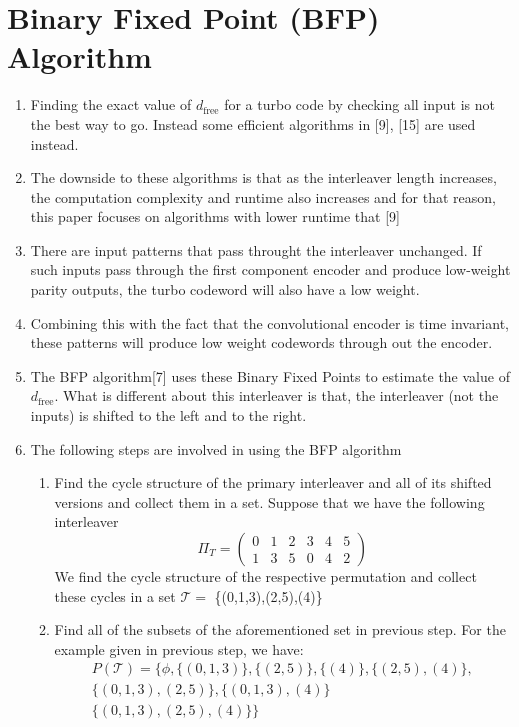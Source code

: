 \documentclass[fontsize=12pt]{article}
\begin{document}
\section{Binary Fixed Point (BFP) Algorithm }
\begin{enumerate}
\item Finding the exact value of $d_{\text{free}}$ for a turbo code by checking all input is not the best way to go. Instead some efficient algorithms in [9], [15] are used instead.

\item The downside to these algorithms is that as the interleaver length increases, the computation complexity and runtime also increases and for that reason, this paper focuses on algorithms with lower runtime that [9]

\item There are input patterns that pass throught the interleaver unchanged. If such inputs pass through the first component encoder and produce low-weight parity outputs, the turbo codeword will also have a low weight.

\item Combining this with the fact that the convolutional encoder is time invariant, these patterns will produce low weight codewords through out the  encoder.

\item The BFP algorithm[7] uses  these Binary Fixed Points to estimate the value of $d_{\text{free}}$. What is different about this interleaver is that, the interleaver (not the inputs) is shifted to the left and to the right.

\item The following steps are involved in using the BFP algorithm
\begin{enumerate}
\item Find the cycle structure of the primary interleaver and all of its shifted versions and collect them in a set. Suppose that we have the following interleaver
\[
\Pi_{T}=\left(\begin{array}{cccccc}
0 & 1 & 2 & 3 & 4 & 5 \\
1 & 3 & 5 & 0 & 4 & 2
\end{array}\right)
\]
We find the cycle structure of the respective permutation and collect these cycles in a set $\mathcal{T}=$ \{(0,1,3),(2,5),(4)\}

\item Find all of the subsets of the aforementioned set in
previous step. For the example given in previous step, we have:
\[
\begin{array}{c}
P(\mathcal{T})=\{\phi,\{(0,1,3)\},\{(2,5)\},\{(4)\},\{(2,5),(4)\}, \\
\{(0,1,3),(2,5)\},\{(0,1,3),(4)\} \\
\{(0,1,3),(2,5),(4)\}\}
\end{array}
\]


\end{enumerate}
\end{enumerate}
\end{document}
